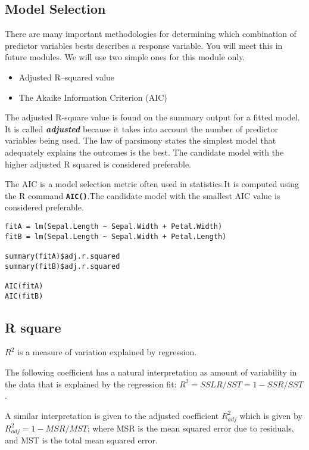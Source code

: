 \documentclass[a4paper,12pt]{article}
\begin{document}
\subsection{Model Selection}
There are many important methodologies for determining which combination of predictor variables bests describes a response variable. You will meet this in future modules.
We will use two simple ones for this module only.
\begin{itemize}
\item Adjusted R–squared value
\item The Akaike Information Criterion (AIC)
\end{itemize}


The adjusted R-square value is found on the summary output for a fitted model. It is called \textbf{\emph{adjusted}} because it takes into account the number of predictor variables being used. The law of parsimony states the simplest model that adequately explains the outcomes is the best. The candidate model with the higher adjusted R squared is considered preferable.

The AIC is a model selection metric often used in statistics.It is computed using the R command
\texttt{\textbf{AIC()}}.The candidate model with the smallest AIC value is considered preferable.

\begin{framed}
\begin{verbatim}
fitA = lm(Sepal.Length ~ Sepal.Width + Petal.Width)
fitB = lm(Sepal.Length ~ Sepal.Width + Petal.Length)

summary(fitA)$adj.r.squared
summary(fitB)$adj.r.squared

AIC(fitA)
AIC(fitB)
\end{verbatim}
\end{framed}
 



\subsection{R square}
$R^2$ is a measure of variation explained by regression.

The following coefficient has a natural interpretation as amount
of variability in the data that is explained by the regression
fit: $R^2 = SSLR/SST = 1 - SSR/SST$.

A similar interpretation is given to the adjusted coefficient
$R^2_{adj}$ which is given by $R^2_{adj} = 1 - MSR/MST $; where
MSR is the mean squared error due to residuals, and MST is the
total mean squared error.
\end{document}
